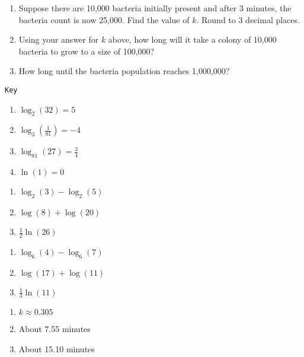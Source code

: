 \documentclass{article}
\newcounter{pset}
\newcounter{key}
\begin{document}
\begin{enumerate}   \setcounter{enumi}{\value{pset}}
    \item Suppose there are 10,000 bacteria initially present and after 3 minutes, the bacteria count is now 25,000. Find the value of $k$. Round to 3 decimal places.
    \item Using your answer for $k$ above, how long will it take a colony of 10,000 bacteria to grow to a size of 100,000?
    \item How long until the bacteria population reaches 1,000,000?
\end{enumerate}     \setcounter{pset}{\value{enumi}}
\vfill 

\dotfill \newline 
\texttt{Key} 

\begin{multicols}{4}
\begin{enumerate}
    \item $\log_2(32) = 5$
    \item $\log_3\left(\frac{1}{81}\right)=-4$
    \item $\log_{81}(27) = \frac{3}{4}$
    \item $\ln(1) = 0$
\end{enumerate}     \setcounter{key}{\value{enumi}}
\end{multicols}
\begin{multicols}{3}
\begin{enumerate}   \setcounter{enumi}{\value{key}}
    \item $\log_2(3) - \log_2(5)$
    \item $\log(8) + \log(20)$
    \item $\frac{1}{2}\ln(26)$
\end{enumerate}     \setcounter{key}{\value{enumi}}
\end{multicols}
\begin{multicols}{3}
\begin{enumerate}   \setcounter{enumi}{\value{key}}
    \item $\log_6(4) - \log_6(7)$
    \item $\log(17) + \log(11)$
    \item $\frac{1}{3}\ln(11)$
\end{enumerate}     \setcounter{key}{\value{enumi}}
\end{multicols}
\begin{multicols}{3}
\begin{enumerate}   \setcounter{enumi}{\value{key}}
    \item $k \approx 0.305$
    \item About 7.55 minutes
    \item About 15.10 minutes
\end{enumerate}     \setcounter{key}{\value{enumi}}
\end{multicols}
\end{document}
